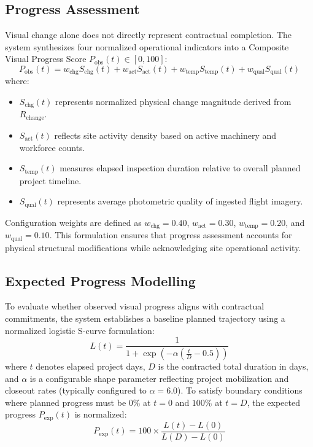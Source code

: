 \documentclass[conference]{IEEEtran}
\begin{document}
\subsection{Progress Assessment}
Visual change alone does not directly represent contractual completion. The system synthesizes four normalized operational indicators into a Composite Visual Progress Score $P_{\text{obs}}(t) \in [0, 100]$:
\begin{equation}
    P_{\text{obs}}(t) = w_{\text{chg}} S_{\text{chg}}(t) + w_{\text{act}} S_{\text{act}}(t) + w_{\text{temp}} S_{\text{temp}}(t) + w_{\text{qual}} S_{\text{qual}}(t)
    \label{eq:p_obs}
\end{equation}
where:
\begin{itemize}
    \item $S_{\text{chg}}(t)$ represents normalized physical change magnitude derived from $R_{\text{change}}$.
    \item $S_{\text{act}}(t)$ reflects site activity density based on active machinery and workforce counts.
    \item $S_{\text{temp}}(t)$ measures elapsed inspection duration relative to overall planned project timeline.
    \item $S_{\text{qual}}(t)$ represents average photometric quality of ingested flight imagery.
\end{itemize}
Configuration weights are defined as $w_{\text{chg}} = 0.40$, $w_{\text{act}} = 0.30$, $w_{\text{temp}} = 0.20$, and $w_{\text{qual}} = 0.10$. This formulation ensures that progress assessment accounts for physical structural modifications while acknowledging site operational activity.

\subsection{Expected Progress Modelling}
To evaluate whether observed visual progress aligns with contractual commitments, the system establishes a baseline planned trajectory using a normalized logistic S-curve formulation:
\begin{equation}
    L(t) = \frac{1}{1 + \exp\left(-\alpha \left( \frac{t}{D} - 0.5 \right)\right)}
    \label{eq:logistic}
\end{equation}
where $t$ denotes elapsed project days, $D$ is the contracted total duration in days, and $\alpha$ is a configurable shape parameter reflecting project mobilization and closeout rates (typically configured to $\alpha = 6.0$). To satisfy boundary conditions where planned progress must be $0\%$ at $t=0$ and $100\%$ at $t=D$, the expected progress $P_{\text{exp}}(t)$ is normalized:
\begin{equation}
    P_{\text{exp}}(t) = 100 \times \frac{L(t) - L(0)}{L(D) - L(0)}
    \label{eq:p_exp}
\end{equation}
\end{document}
